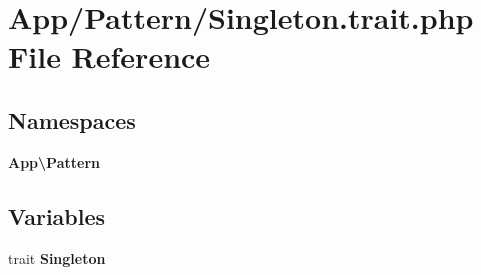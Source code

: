 \section{App/\+Pattern/\+Singleton.trait.\+php File Reference}
\label{_singleton_8trait_8php}
\subsection*{Namespaces}
\begin{DoxyCompactItemize}
\item 
 \textbf{ App\textbackslash{}\+Pattern}
\end{DoxyCompactItemize}
\subsection*{Variables}
\begin{DoxyCompactItemize}
\item 
trait \textbf{ Singleton}
\end{DoxyCompactItemize}
